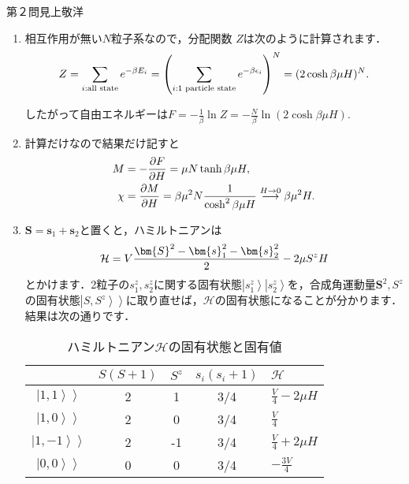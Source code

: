 \newcommand{\pdif}[2]{\frac{\partial {#1}}{\partial {#2}}}
\newcommand{\ket}[1]{\left| {#1} \right\rangle}
\newcommand{\kett}[1]{\left. \left| {#1} \right\rangle \!\! \right\rangle}
\begin{answer}{第２問}{見上敬洋}
\begin{enumerate}
\item
  相互作用が無い$N$粒子系なので，分配関数 $Z$は次のように計算されます．
  \begin{equation}
  Z = \sum_{i:\text{all state}} e^{-\beta E_i} = \left( \sum_{i:\text{1 particle state}} e^{-\beta \epsilon_i} \right)^N = (2 \cosh \beta \mu H)^N . \notag
  \end{equation}

  したがって自由エネルギーは$\displaystyle F = -\frac 1\beta \ln Z = -\frac N\beta \ln(2\cosh \beta \mu H) .$

\item
  計算だけなので結果だけ記すと
  \begin{align}
  M &= -\pdif{F}{H} = \mu N \tanh \beta \mu H, \notag \\
  \chi &= \pdif{M}{H} = \beta \mu^2 N \frac{1}{\cosh ^2 \beta \mu H} \stackrel{H\to 0}{\longrightarrow} \beta \mu^2 H .\notag
  \end{align}

\item
  $\bm{S} = \bm{s}_1+\bm{s}_2$と置くと，ハミルトニアンは
  \begin{equation}
  \mathcal{H} = V \frac{\bm{S}^2-\bm{s}_1^2 -\bm{s}_2^2}{2} -2\mu S^z H \notag 
  \end{equation}
  とかけます．2粒子の$s_1^z, s_2^z$に関する固有状態$\ket{s_1^z}\ket{s_2^z}$を，合成角運動量$\bm{S}^2, S^z$の固有状態$\kett{S,S^z}$に取り直せば，$\mathcal{H}$の固有状態になることが分かります．結果は次の通りです．
  \begin{table}[ht!]
  \begin{center}
    \caption{ハミルトニアン$\mathcal{H}$の固有状態と固有値}
      \begin{tabular}{|c|cccl|} \hline
      & $S(S+1)$ & $S^z$ & $s_i(s_i+1)$ & $\mathcal{H}$ \\\hline
      $\kett{1,1}$ & 2 & 1 & 3/4 & $\frac V4 -2\mu H $ \\
      $\kett{1,0}$ & 2 & 0 & 3/4 & $\frac V4 $ \\
      $\kett{1,-1}$ & 2 & -1 & 3/4 & $\frac V4 +2\mu H $ \\
      $\kett{0,0}$ & 0 & 0 & 3/4 & $-\frac {3V}4$\\\hline
      \end{tabular}
    \end{center}
  \end{table}


\end{enumerate}
\end{answer}
